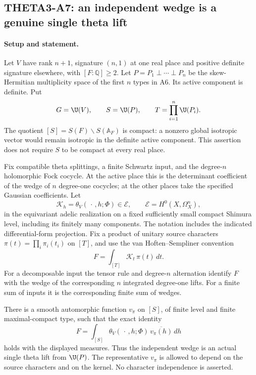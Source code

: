 \documentclass[11pt]{article}
\newcommand{\Q}{\mathbb Q}\newcommand{\C}{\mathbb C}\newcommand{\Z}{\mathbb Z}\newcommand{\R}{\mathbb R}\newcommand{\A}{\mathbb A}\newcommand{\OO}{\mathcal O}
\theoremstyle{definition}\newtheorem{definition}[theorem]{Definition}\newtheorem{remark}[theorem]{Remark}
\begin{document}

\subsection{THETA3-A7: an independent wedge is a genuine single theta lift}\label{A7}

\paragraph{Setup and statement.}
Let $V$ have rank $n+1$, signature $(n,1)$ at one real place and
positive definite signature elsewhere, with $[F:\Q]\geq2$.
Let $P=P_1\perp\cdots\perp P_n$ be the skew-Hermitian multiplicity
space of the first $n$ types in A6. Its active component is definite.
Put
\[
 G=\U(V),\qquad S=\U(P),\qquad T=\prod_{i=1}^n\U(P_i).
\]
The quotient $[S]=S(F)\backslash S(\A_F)$ is compact: a nonzero
global isotropic vector would remain isotropic in the definite
active component. This assertion does not require $S$ to be compact
at every real place.

Fix compatible theta splittings, a finite Schwartz input, and the
degree-$n$ holomorphic Fock cocycle. At the active place this is
the determinant coefficient of the wedge of $n$ degree-one
cocycles; at the other places take the specified Gaussian
coefficients. Let
\[
 \mathcal K_h=\theta_V(\,\cdot\,,h;\Phi)\in\mathcal E,\qquad
 \mathcal E=H^0(X,\Omega_X^n),
\]
in the equivariant adelic realization on a fixed sufficiently small
compact Shimura level, including its finitely many components.
The notation includes the indicated differential-form projection.
Fix a product of unitary source characters
$\pi(t)=\prod_i\pi_i(t_i)$ on $[T]$, and use the
van Hoften--Sempliner convention
\[
 F=\int_{[T]}\mathcal K_t\,\pi(t)\,dt.
\]
For a decomposable input the tensor rule and degree-$n$ alternation
identify $F$ with the wedge of the corresponding $n$ integrated
degree-one lifts. For a finite sum of inputs it is the corresponding
finite sum of wedges.

There is a smooth automorphic function $v_\pi$ on $[S]$, of finite
level and finite maximal-compact type, such that the exact identity
\begin{equation}\label{A7-lift}
 F=\int_{[S]}\theta_V(\,\cdot\,,h;\Phi)\,
                                  \overline{v_\pi(h)}\,dh
\end{equation}
holds with the displayed measures. Thus the independent wedge is
an actual single theta lift from $\U(P)$. The representative
$v_\pi$ is allowed to depend on the source characters and on the
kernel. No character independence is asserted.
\end{document}
